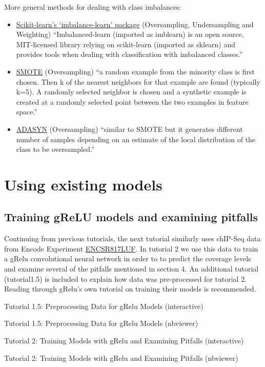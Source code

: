 \documentclass[
]{book}
\begin{document}
More general methods for dealing with class imbalances:

\begin{itemize}
\item
  \href{https://imbalanced-learn.org/stable/user_guide.html\#user-guide}{Scikit-learn's `imbalance-learn' package} (Oversampling, Undersampling and Weighting)
  ``Imbalanced-learn (imported as imblearn) is an open source, MIT-licensed library relying on scikit-learn (imported as sklearn) and provides tools when dealing with classification with imbalanced classes.''
\item
  \href{https://machinelearningmastery.com/smote-oversampling-for-imbalanced-classification/}{SMOTE} (Oversampling)
  ``a random example from the minority class is first chosen. Then k of the nearest neighbors for that example are found (typically k=5). A randomly selected neighbor is chosen and a synthetic example is created at a randomly selected point between the two examples in feature space.''
\item
  \href{https://imbalanced-learn.org/stable/references/generated/imblearn.over_sampling.ADASYN.html}{ADASYN} (Oversampling)
  ``similar to SMOTE but it generates different number of samples depending on an estimate of the local distribution of the class to be oversampled.''
\end{itemize}

\part{Using existing models}\label{part-using-existing-models}

\chapter{Training gReLU models and examining pitfalls}\label{training-grelu-models-and-examining-pitfalls}

Continuing from previous tutorials, the next tutorial similarly uses chIP-Seq data from Encode Experiment \href{https://www.encodeproject.org/experiments/ENCSR817LUF/}{ENCSR817LUF}. In tutorial 2 we use this data to train a gRelu convolutional neural network in order to to predict the coverage levels and examine several of the pitfalls mentioned in section 4. An additional tutorial (tutorial1.5) is included to explain how data was pre-processed for tutorial 2. Reading through gRelu's own tutorial on training their models is recommended.

Tutorial 1.5: Preprocessing Data for gRelu Models (interactive)

Tutorial 1.5: Preprocessing Data for gRelu Models (nbviewer)

Tutorial 2: Training Models with gRelu and Examining Pitfalls (interactive)

Tutorial 2: Training Models with gRelu and Examining Pitfalls (nbviewer)

  
\end{document}
